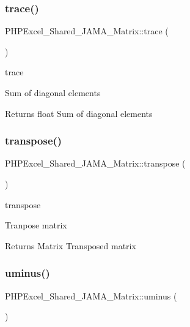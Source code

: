 \subsubsection{\texorpdfstring{trace()}{trace()}}
{\footnotesize\ttfamily P\+H\+P\+Excel\+\_\+\+Shared\+\_\+\+J\+A\+M\+A\+\_\+\+Matrix\+::trace (\begin{DoxyParamCaption}{ }\end{DoxyParamCaption})}

trace

Sum of diagonal elements \begin{DoxyReturn}{Returns}
float Sum of diagonal elements 
\end{DoxyReturn}
\mbox{\label{classPHPExcel__Shared__JAMA__Matrix_a44419497014c3530eb93f616842a1725}} 
\subsubsection{\texorpdfstring{transpose()}{transpose()}}
{\footnotesize\ttfamily P\+H\+P\+Excel\+\_\+\+Shared\+\_\+\+J\+A\+M\+A\+\_\+\+Matrix\+::transpose (\begin{DoxyParamCaption}{ }\end{DoxyParamCaption})}

transpose

Tranpose matrix \begin{DoxyReturn}{Returns}
Matrix Transposed matrix 
\end{DoxyReturn}
\mbox{\label{classPHPExcel__Shared__JAMA__Matrix_a687099a049e1ce9f5e73ab5fe4a66ba5}} 
\subsubsection{\texorpdfstring{uminus()}{uminus()}}
{\footnotesize\ttfamily P\+H\+P\+Excel\+\_\+\+Shared\+\_\+\+J\+A\+M\+A\+\_\+\+Matrix\+::uminus (\begin{DoxyParamCaption}{ }\end{DoxyParamCaption})}

